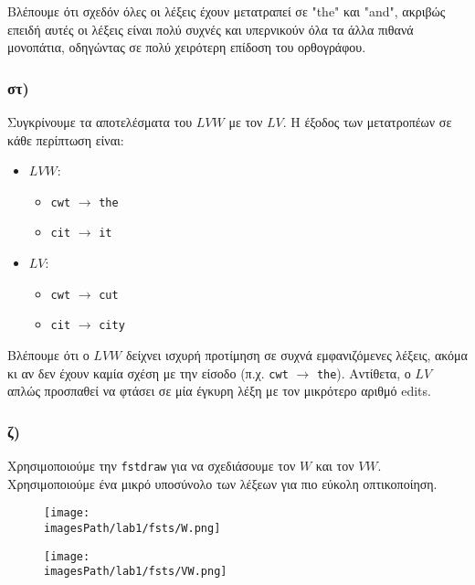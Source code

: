 \documentclass[a4paper, 12pt]{article}
\newcommand{\imagesPath}{.}
\begin{document}
        	Βλέπουμε ότι σχεδόν όλες οι λέξεις έχουν μετατραπεί σε "the" και "and", ακριβώς επειδή αυτές οι λέξεις είναι πολύ συχνές και υπερνικούν όλα τα άλλα πιθανά μονοπάτια, οδηγώντας σε πολύ χειρότερη επίδοση του ορθογράφου.
        	   
        \subsubsection*{στ)}   
        	Συγκρίνουμε τα αποτελέσματα του $LVW$ με τον $LV$. Η έξοδος των μετατροπέων σε κάθε περίπτωση είναι:
        	
        	\begin{itemize}
        		\item $LVW$:
        			\begin{itemize}
        				\item \verb|cwt| $\rightarrow$ \verb|the|
        				\item \verb|cit| $\rightarrow$ \verb|it|
        			\end{itemize}
        		\item $LV$:
        			\begin{itemize}
        				\item \verb|cwt| $\rightarrow$ \verb|cut|
        				\item \verb|cit| $\rightarrow$ \verb|city|
        			\end{itemize}
        	\end{itemize}
        	
        	Βλέπουμε ότι ο $LVW$ δείχνει ισχυρή προτίμηση σε συχνά εμφανιζόμενες λέξεις, ακόμα κι αν δεν έχουν καμία σχέση με την είσοδο (π.χ. \verb|cwt| $\rightarrow$ \verb|the|). Αντίθετα, ο $LV$ απλώς προσπαθεί να φτάσει σε μία έγκυρη λέξη με τον μικρότερο αριθμό edits.
        
        \subsubsection*{ζ)}  
        	Χρησιμοποιούμε την \verb|fstdraw| για να σχεδιάσουμε τον $W$ και τον $VW$. Χρησιμοποιούμε ένα μικρό υποσύνολο των λέξεων για πιο εύκολη οπτικοποίηση.
        	
        	\begin{figure}[H]
        		\texttt{[image: \\imagesPath/lab1/fsts/W.png]}
        	\end{figure}
        	
        	\begin{figure}[H]
        		\texttt{[image: \\imagesPath/lab1/fsts/VW.png]}
        	\end{figure}
        
\end{document}
